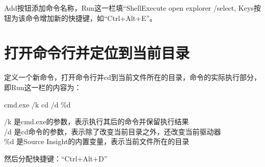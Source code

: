 \documentclass[a4paper,11pt]{article}
\begin{document}
Add按钮添加命令名称，Run这一栏填“ShellExecute open explorer /select,%
Keys按钮为该命令增加新的快捷键，如“Ctrl+Alt+E”。

\section[打开命令行并定位到当前目录]{打开命令行并定位到当前目录}
定义一个新命令，打开命令行并cd到当前文件所在的目录，命令的实际执行部分，
即Run这一栏的内容为：

cmd.exe /k cd /d \%d

/k 是cmd.exe的参数，表示执行其后的命令并保留执行结果\\
/d 是cd命令的参数，表示除了改变当前目录之外，还改变当前驱动器\\
\%d 是Source Insight的内置变量，表示当前文件所在的目录

然后分配快捷键：“Ctrl+Alt+D”
\end{document}
